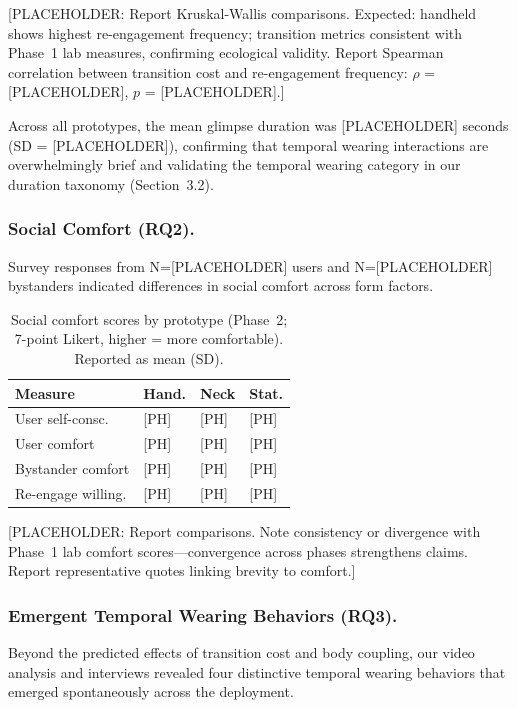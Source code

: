 [PLACEHOLDER: Report Kruskal-Wallis comparisons. Expected: handheld shows highest re-engagement frequency; transition metrics consistent with Phase~1 lab measures, confirming ecological validity. Report Spearman correlation between transition cost and re-engagement frequency: $\rho$ = [PLACEHOLDER], $p$ = [PLACEHOLDER].]

Across all prototypes, the mean glimpse duration was [PLACEHOLDER] seconds (SD = [PLACEHOLDER]), confirming that temporal wearing interactions are overwhelmingly brief and validating the temporal wearing category in our duration taxonomy (Section~3.2).

\subsubsection{Social Comfort (RQ2).}
Survey responses from N=[PLACEHOLDER] users and N=[PLACEHOLDER] bystanders indicated differences in social comfort across form factors.

\begin{table}[t]
\centering
\caption{Social comfort scores by prototype (Phase~2; 7-point Likert, higher = more comfortable). Reported as mean (SD).}
\label{tab:deploy-comfort}
\begin{tabular}{p{2.5cm} p{1.5cm} p{1.5cm} p{1.5cm}}
\toprule
\textbf{Measure} & \textbf{Hand.} & \textbf{Neck} & \textbf{Stat.} \\
\midrule
User self-consc. & [PH] & [PH] & [PH] \\
User comfort & [PH] & [PH] & [PH] \\
Bystander comfort & [PH] & [PH] & [PH] \\
Re-engage willing. & [PH] & [PH] & [PH] \\
\bottomrule
\end{tabular}
\end{table}

[PLACEHOLDER: Report comparisons. Note consistency or divergence with Phase~1 lab comfort scores---convergence across phases strengthens claims. Report representative quotes linking brevity to comfort.]

\subsubsection{Emergent Temporal Wearing Behaviors (RQ3).}
Beyond the predicted effects of transition cost and body coupling, our video analysis and interviews revealed four distinctive temporal wearing behaviors that emerged spontaneously across the deployment.

